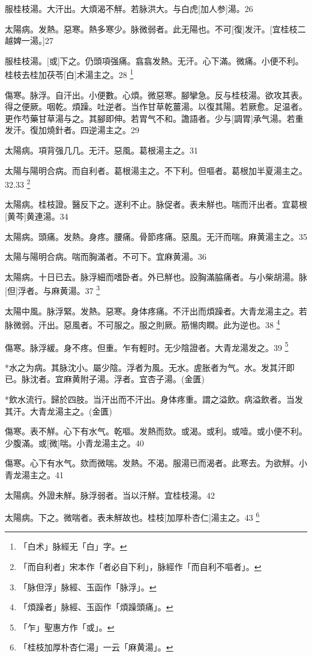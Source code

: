\documentclass[12pt,twoside,UTF8,b5paper]{ctexbook}
\begin{document}
服桂枝湯。大汗出。大煩渴不觧。若脉洪大。与白虎[加人参]湯。26

太陽病。发熱。惡寒。熱多寒少。脉微弱者。此无陽也。不可[復]发汗。[宜桂枝二越婢一湯。]27

服桂枝湯。[或]下之。仍頭項强痛。翕翕发熱。无汗。心下滿。微痛。小便不利。桂枝去桂加茯苓[白]术湯主之。28
	\footnote{「白术」脉經无「白」字。}

傷寒。脉浮。自汗出。小便數。心煩。微惡寒。腳攣急。反与桂枝湯。欲攻其表。得之便厥。咽乾。煩躁。吐逆者。当作甘草乾薑湯。以復其陽。若厥愈。足温者。更作芍藥甘草湯与之。其腳即伸。若胃气不和。譫語者。少与[調胃]承气湯。若重发汗。復加燒針者。四逆湯主之。29

太陽病。項背强几几。无汗。惡風。葛根湯主之。31

太陽与陽明合病。而自利者。葛根湯主之。不下利。但嘔者。葛根加半夏湯主之。32.33
	\footnote{「而自利者」宋本作「者必自下利」，脉經作「而自利不嘔者」。}

太陽病。桂枝證。醫反下之。遂利不止。脉促者。表未觧也。喘而汗出者。宜葛根[黄芩]黄連湯。34

太陽病。頭痛。发熱。身疼。腰痛。骨節疼痛。惡風。无汗而喘。麻黄湯主之。35

太陽与陽明合病。喘而胸滿者。不可下。宜麻黄湯。36

太陽病。十日已去。脉浮細而嗜卧者。外已觧也。設胸滿脇痛者。与小柴胡湯。脉[但]浮者。与麻黄湯。37
	\footnote{「脉但浮」脉經、玉函作「脉浮」。}

太陽中風。脉浮緊。发熱。惡寒。身体疼痛。不汗出而煩躁者。大青龙湯主之。若脉微弱。汗出。惡風者。不可服之。服之則厥。筋愓肉瞤。此为逆也。38
	\footnote{「煩躁者」脉經、玉函作「煩躁頭痛」。}

傷寒。脉浮緩。身不疼。但重。乍有輕时。无少陰證者。大青龙湯发之。39
	\footnote{「乍」聖惠方作「或」。}

*水之为病。其脉沈小。屬少陰。浮者为風。无水。虗胀者为气。水。发其汗即已。脉沈者。宜麻黄附子湯。浮者。宜杏子湯。(金匱)

*飲水流行。歸於四肢。当汗出而不汗出。身体疼重。謂之溢飲。病溢飲者。当发其汗。大青龙湯主之。(金匱)

傷寒。表不觧。心下有水气。乾嘔。发熱而欬。或渴。或利。或噎。或小便不利。少腹滿。或[微]喘。小青龙湯主之。40

傷寒。心下有水气。欬而微喘。发熱。不渴。服湯已而渴者。此寒去。为欲觧。小青龙湯主之。41

太陽病。外證未觧。脉浮弱者。当以汗觧。宜桂枝湯。42

太陽病。下之。微喘者。表未觧故也。桂枝[加厚朴杏仁]湯主之。43
	\footnote{「桂枝加厚朴杏仁湯」一云「麻黄湯」。}
\end{document}
